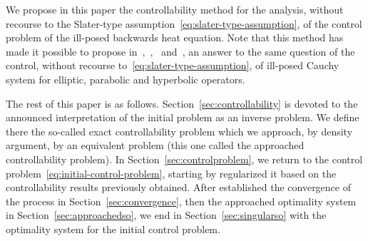 We propose in this paper the controllability method for the analysis,
without recourse to the Slater-type
assumption~\eqref{eq:slater-type-assumption}, of the control problem of the
ill-posed backwards heat equation. Note that this method has made it
possible to propose
in~\cite{ownElliptic},~\cite{ownAAA},~\cite{ownParabolic}
and~\cite{ownhyperbolic}, an answer to the same question of the control,
without recourse to~\eqref{eq:slater-type-assumption}, of ill-posed Cauchy
system for elliptic, parabolic and hyperbolic operators.

The rest of this paper is as follows. Section~\ref{sec:controllability}
is devoted to the announced interpretation of the initial problem as an
inverse problem. We define there the so-called exact controllability
problem which we approach, by density argument, by an equivalent problem
(this one called the approached controllability problem). In
Section~\ref{sec:controlproblem}, we return to the control
problem~\eqref{eq:initial-control-problem}, starting by regularized it
based on the controllability results previously obtained. After established
the convergence of the process in Section~\ref{sec:convergence}, then the
approached optimality system in Section~\ref{sec:approachedso}, we end in
Section~\ref{sec:singularso} with the optimality system for the initial
control problem.
